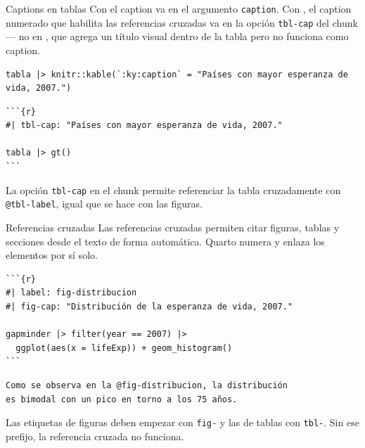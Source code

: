 \documentclass[8pt]{beamer}
\begin{document}
	\begin{frame}[fragile]{Captions en tablas}
		Con  el caption va en el argumento \texttt{caption}. Con , el caption numerado que habilita las referencias cruzadas va en la opción \texttt{tbl-cap} del chunk --- no en , que agrega un título visual dentro de la tabla pero no funciona como caption.

\begin{lstlisting}[style=RScript]
tabla |> knitr::kable(`:ky:caption` = "Países con mayor esperanza de vida, 2007.")
\end{lstlisting}

\begin{lstlisting}
```{r}
#| tbl-cap: "Países con mayor esperanza de vida, 2007."

tabla |> gt()
```
\end{lstlisting}

		\begin{exampleblock}{}
			La opción \texttt{tbl-cap} en el chunk permite referenciar la tabla cruzadamente con \texttt{@tbl-label}, igual que se hace con las figuras.
		\end{exampleblock}
	\end{frame}


	\begin{frame}[fragile]{Referencias cruzadas}
		Las referencias cruzadas permiten citar figuras, tablas y secciones desde el texto de forma automática. Quarto numera y enlaza los elementos por sí solo.

\begin{lstlisting}
```{r}
#| label: fig-distribucion
#| fig-cap: "Distribución de la esperanza de vida, 2007."

gapminder |> filter(year == 2007) |>
  ggplot(aes(x = lifeExp)) + geom_histogram()
```
\end{lstlisting}

\begin{lstlisting}
Como se observa en la @fig-distribucion, la distribución
es bimodal con un pico en torno a los 75 años.
\end{lstlisting}

		\begin{alertblock}{}
			Las etiquetas de figuras deben empezar con \texttt{fig-} y las de tablas con \texttt{tbl-}. Sin ese prefijo, la referencia cruzada no funciona.
		\end{alertblock}
	\end{frame}
\end{document}
